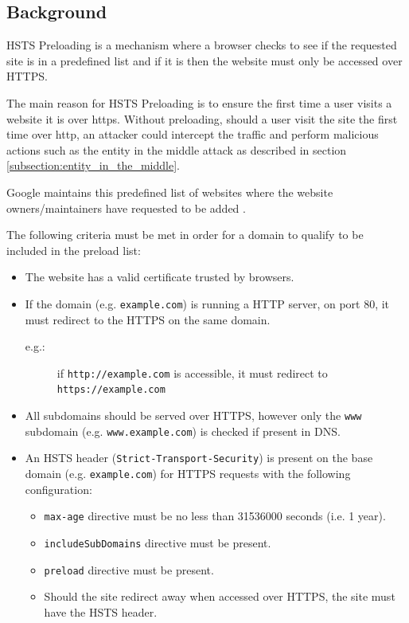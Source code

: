 \documentclass{mscreport}
\begin{document}
\subsection{Background}

HSTS Preloading is a mechanism where a browser checks to see if the requested site is in a predefined list and if it is then the website must only be accessed over HTTPS.

\vspace{0.3cm} \noindent
The main reason for HSTS Preloading is to ensure the first time a user visits a website it is over https. Without preloading, should a user visit the site the first time over http, an attacker could intercept the traffic and perform malicious actions such as the entity in the middle attack as described in section \ref{subsection:entity_in_the_middle}.

\vspace{0.3cm} \noindent
Google maintains this predefined list of websites where the website owners/maintainers have requested to be added \cite{Hodges2012-pe}.

\vspace{0.3cm} \noindent
The following criteria must be met in order for a domain to qualify to be included in the preload list:

\begin{itemize}
  \setlength\itemsep{0.1em}
  \item The website has a valid certificate trusted by browsers.
  \item If the domain (e.g. \texttt{example.com}) is running a HTTP server, on port 80, it must redirect to the HTTPS on the same domain.
  \begin{description}
  \item[e.g.:] if \texttt{http://example.com} is accessible, it must redirect to \texttt{https://example.com}
  \end{description}
  \item All subdomains should be served over HTTPS, however only the \texttt{www} subdomain (e.g. \texttt{www.example.com}) is checked if present in DNS.
  \item An HSTS header (\texttt{Strict-Transport-Security}) is present on the base domain (e.g. \texttt{example.com}) for HTTPS requests with the following configuration:
  \begin{itemize}
    \item \texttt{max-age} directive must be no less than 31536000 seconds (i.e. 1 year).
    \item \texttt{includeSubDomains} directive must be present.
    \item \texttt{preload} directive must be present.
    \item Should the site redirect away when accessed over HTTPS, the site must have the HSTS header.
  \end{itemize} 
\end{itemize}
\end{document}
